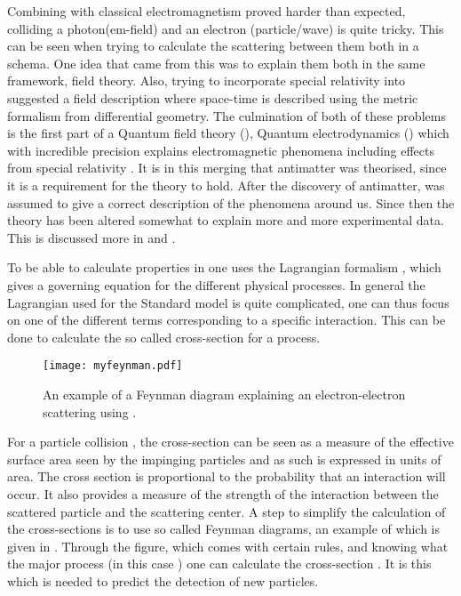 Combining \abbrQM with classical electromagnetism proved harder than expected, colliding a photon(em-field) and an electron (particle/wave) is quite tricky. This can be seen when trying to calculate the scattering between them both in a \abbrQM schema. One idea that came from this was to explain them both in the same framework, field theory. Also, trying to incorporate special relativity into \abbrQM suggested a field description where space-time is described using the metric formalism from differential geometry.
The culmination of both of these problems is the first part of a Quantum field theory (\abbrQFT), Quantum electrodynamics (\abbrQED) which with incredible precision explains electromagnetic phenomena including effects from special relativity \citep{Zee:2003}. It is in this merging that antimatter was theorised, since it is a requirement for the theory to hold. After the discovery of antimatter, \abbrQED was assumed to give a correct description of the phenomena around us. Since then the theory has been altered somewhat to explain more and more experimental data. This is discussed more in  and .

To be able to calculate properties in \abbrQFT one uses the Lagrangian formalism \citep{Goldstein:2001}, which gives a governing equation for the different physical processes. In general the Lagrangian used for the Standard model is quite complicated, one can thus focus on one of the different terms corresponding to a specific interaction. This can be done to calculate the so called cross-section for a process. 

\begin{SCfigure}[][h]
 \centering
 \texttt{[image: myfeynman.pdf]}
  \caption{{\small An example of a Feynman diagram explaining an electron-electron scattering using \abbrQED.}}
    \label{fig:exFeynman}
\end{SCfigure}

For a particle collision \citep{Herr:2006}, the cross-section can be seen as a measure of the effective surface area seen by the impinging particles and as such is expressed in units of area. The cross section is proportional to the probability that an interaction will occur. It also provides a measure of the strength of the interaction between the scattered particle and the scattering center. A step to simplify the calculation of the cross-sections is to use so called Feynman diagrams, an example of which is given in . Through the figure, which comes with certain rules, and knowing what the major process (in this case \abbrQED) one can calculate the cross-section \citep{Zee:2003,Herr:2006}. It is this which is needed to predict the detection of new particles. 

